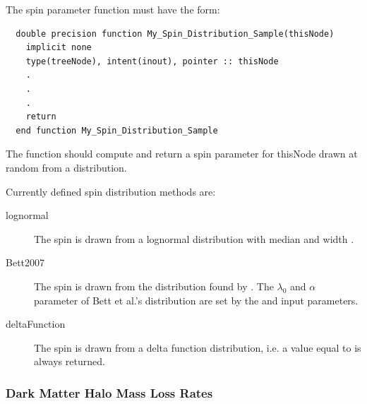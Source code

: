The spin parameter function must have the form:
\begin{verbatim}
  double precision function My_Spin_Distribution_Sample(thisNode)
    implicit none
    type(treeNode), intent(inout), pointer :: thisNode
    .
    .
    .
    return
  end function My_Spin_Distribution_Sample
\end{verbatim}
The function should compute and return a spin parameter for {\normalfont \ttfamily thisNode} drawn at random from a distribution.

Currently defined spin distribution methods are:
\begin{description}
 \item [{\normalfont \ttfamily lognormal}] The spin is drawn from a lognormal distribution with median {\normalfont \ttfamily [lognormalSpinDistributionMedian]} and width {\normalfont \ttfamily [lognormalSpinDistributionSigma]}.
 \item [{\normalfont \ttfamily Bett2007}] The spin is drawn from the distribution found by \cite{bett_spin_2007}. The $\lambda_0$ and $\alpha$ parameter of Bett et al.'s distribution are set by the {\normalfont {}} and {\normalfont {}} input parameters.
 \item [{\normalfont \ttfamily deltaFunction}] The spin is drawn from a delta function distribution, i.e. a value equal to {\normalfont \ttfamily [deltaFunctionSpinDistributionSpin]} is always returned.
\end{description}

\subsubsection{Dark Matter Halo Mass Loss Rates}\label{sec:HaloMassLossRates}

